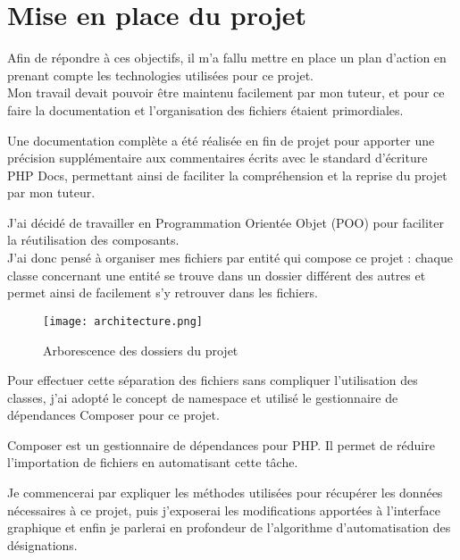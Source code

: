 \section{Mise en place du projet}
\vspace{1cm}

Afin de répondre à ces objectifs, il m’a fallu mettre en place un plan d’action en prenant compte les technologies utilisées pour ce projet.\\
Mon travail devait pouvoir être maintenu facilement par mon tuteur, et pour ce faire la documentation et l’organisation des fichiers étaient primordiales.

\begin{commentaire}
    Une documentation complète a été réalisée en fin de projet pour apporter une précision supplémentaire aux commentaires écrits avec le standard d'écriture PHP Docs, permettant ainsi de faciliter la compréhension et la reprise du projet par mon tuteur.
\end{commentaire}

J'ai décidé de travailler en Programmation Orientée Objet (POO) pour faciliter la réutilisation des composants.\\
J’ai donc pensé à organiser mes fichiers par entité qui compose ce projet : chaque classe concernant une entité se trouve dans un dossier différent des autres et permet ainsi de facilement s’y retrouver dans les fichiers.

\begin{figure}[!h]
    \centering
    \texttt{[image: architecture.png]}
    \caption{Arborescence des dossiers du projet}
\end{figure}

\pagebreak

Pour effectuer cette séparation des fichiers sans compliquer l’utilisation des classes, j’ai adopté le concept de namespace et utilisé le gestionnaire de dépendances Composer pour ce projet.

\begin{commentaire}
    Composer est un gestionnaire de dépendances pour PHP. Il permet de réduire l’importation de fichiers en automatisant cette tâche.
\end{commentaire}

\vspace{2cm}

 Je commencerai par expliquer les méthodes utilisées pour récupérer les données nécessaires à ce projet, puis j’exposerai les modifications apportées à l’interface graphique et enfin je parlerai en profondeur de l’algorithme d’automatisation des désignations.